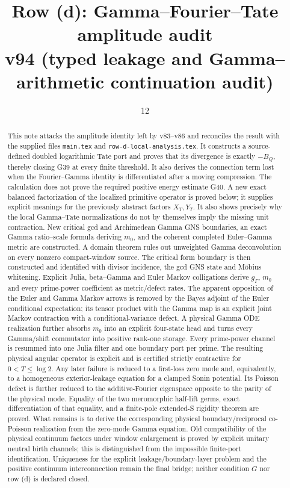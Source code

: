 \documentclass[11pt]{article}
\title{Row (d): Gamma--Fourier--Tate amplitude audit\\
v94 (typed leakage and Gamma--arithmetic continuation audit)}
\author{}
\date{12}
\begin{document}
\maketitle

\begin{abstract}
This note attacks the amplitude identity left by v83--v86 and reconciles the
result with the supplied files \texttt{main.tex} and
\texttt{row-d-local-analysis.tex}.  It constructs a
source-defined doubled logarithmic Tate port and proves that its divergence is
exactly $-B_Q$, thereby closing G39 at every finite threshold.  It also derives
the connection term lost when the Fourier--Gamma identity is differentiated
after a moving compression.  The calculation does not prove the required
positive energy estimate G40.  A new exact balanced factorization of the
localized primitive operator is proved below; it supplies explicit meanings
for the previously abstract factors $X_T,Y_T$.  It also shows precisely why
the local Gamma--Tate normalizations do not by themselves imply the missing
unit contraction.  New critical gcd and Archimedean Gamma GNS boundaries,
an exact Gamma ratio--scale formula deriving $m_0$, and the coherent completed
Euler--Gamma metric are constructed.  A domain theorem rules out unweighted
Gamma deconvolution on every nonzero compact-window source.  The critical
form boundary is then constructed and identified with divisor incidence, the
gcd GNS state and M\"obius whitening.  Explicit Julia, beta--Gamma and Euler
Markov colligations derive $g_\Gamma$, $m_0$ and every prime-power coefficient
as metric/defect rates.  The apparent opposition of the Euler and Gamma
Markov arrows is removed by the Bayes adjoint of the Euler conditional
expectation; its tensor product with the Gamma map is an explicit joint
Markov contraction with a conditional-variance defect.  A physical Gamma ODE realization further absorbs
$m_0$ into an explicit four-state head and turns every Gamma/shift commutator
into positive rank-one storage.  Every prime-power channel is resummed into
one Julia filter and one boundary port per prime.  The resulting physical
angular operator is explicit and is certified strictly contractive for
$0<T\le\log2$.  Any later failure is reduced to a first-loss zero mode and,
equivalently, to a homogeneous exterior-leakage equation for a clamped Sonin
potential.  Its Poisson defect is further reduced to the additive-Fourier
eigenspace opposite to the parity of the physical mode.  Equality of the two
meromorphic half-lift germs, exact differentiation of that equality, and a
finite-pole extended-S rigidity theorem are proved.  What remains is to
derive the corresponding physical boundary/reciprocal co-Poisson realization
from the zero-mode Gamma equation.  Old compatibility of the physical
continuum factors under window enlargement is proved by explicit unitary
neutral birth channels; this is distinguished from the impossible finite-port
identification.  Uniqueness for the explicit leakage/boundary-layer problem
and the positive continuum interconnection remain the final bridge; neither
condition $G$ nor row (d) is declared closed.
\end{abstract}
\end{document}
